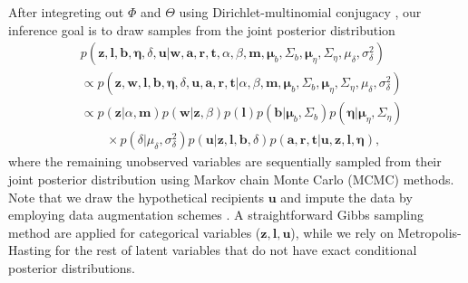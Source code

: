 \documentclass{article}
\begin{document}
After integreting out $\Phi$ and $\Theta$ using Dirichlet-multinomial conjugacy \cite{griffiths2004finding}, our inference goal is to draw samples from the joint posterior distribution
\begin{equation*}
\begin{aligned}
&p(\boldsymbol{z},\boldsymbol{l},\boldsymbol{b}, \boldsymbol{\eta}, \delta,\boldsymbol{u}|\boldsymbol{w}, \boldsymbol{a}, \boldsymbol{r}, \boldsymbol{t}, \alpha, \beta, \boldsymbol{m}, \boldsymbol{\mu}_b, \Sigma_b, \boldsymbol{\mu}_\eta, \Sigma_\eta, {\mu}_\delta,\sigma^2_\delta)\\
&\propto p(\boldsymbol{z},\boldsymbol{w},\boldsymbol{l},\boldsymbol{b}, \boldsymbol{\eta}, \delta,\boldsymbol{u}, \boldsymbol{a}, \boldsymbol{r}, \boldsymbol{t}| \alpha, \beta, \boldsymbol{m}, \boldsymbol{\mu}_b, \Sigma_b, \boldsymbol{\mu}_\eta, \Sigma_\eta, {\mu}_\delta,\sigma^2_\delta)\\
& \propto p(\boldsymbol{z}|\alpha, \boldsymbol{m})p(\boldsymbol{w}|\boldsymbol{z}, \beta)p(\boldsymbol{l})p(\boldsymbol{b}|\boldsymbol{\mu}_b, \Sigma_b)p( \boldsymbol{\eta}|\boldsymbol{\mu}_\eta, \Sigma_\eta)\\
& \quad\quad\times p(\delta| {\mu}_\delta,\sigma^2_\delta)p(\boldsymbol{u}|\boldsymbol{z},\boldsymbol{l}, \boldsymbol{b}, \delta)p(\boldsymbol{a},\boldsymbol{r}, \boldsymbol{t}|\boldsymbol{u},\boldsymbol{z},\boldsymbol{l}, \boldsymbol{\eta}),
\end{aligned}
\label{eqn:jointposterior}
\end{equation*}
where the remaining unobserved variables are sequentially sampled from their joint posterior distribution using Markov chain Monte Carlo (MCMC) methods. Note that we draw the hypothetical recipients $\boldsymbol{u}$ and impute the data by employing data augmentation schemes \cite{tanner1987calculation}. A straightforward Gibbs sampling method are applied for categorical variables ($\boldsymbol{z},\boldsymbol{l},\boldsymbol{u}$), while we rely on Metropolis-Hasting for the rest of latent variables that do not have exact conditional posterior distributions.
\end{document}
